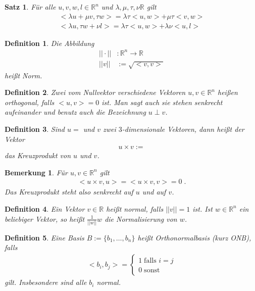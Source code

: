 \documentclass[]{article}
\newtheorem{Definition}{Definition}
\newtheorem{Satz}{Satz}
\newtheorem{Bemerkung}{Bemerkung}
\begin{document}
\begin{Satz}
Für alle $u,v,w,l \in \mathbb{R}^n$ und $\lambda, \mu, \tau, \nu \mathbb{R}$ gilt
\begin{align*}
<\lambda u + \mu v, \tau w> = \lambda \tau<u,w> + \mu \tau <v,w> \\
<\lambda u , \tau w + \nu l> = \lambda \tau<u,w> + \lambda \nu <u,l>
\end{align*}
\end{Satz}
\begin{Definition}
Die Abbildung 
\begin{align*}
|| \cdot || &: \mathbb{R}^n  \to \mathbb{R} \\
||v||  &:= \sqrt{<v,v>} 
\end{align*}  
heißt Norm.
\end{Definition}

\begin{Definition}
Zwei vom Nullvektor verschiedene Vektoren $u,v \in \mathbb{R}^n$ heißen orthogonal, falls $<u,v> = 0$ ist. 
Man sagt auch sie stehen senkrecht aufeinander und benutz auch die Bezeichnung $u \perp v$. 
\end{Definition}

\begin{Definition}
Sind $u = $ und $v$ zwei $3$-dimensionale Vektoren, dann heißt der Vektor
\begin{align*}
u \times v := 
\end{align*}
 das Kreuzprodukt von $u$ und $v$.
\end{Definition}

\begin{Bemerkung}
Für $u , v \in \mathbb{R}^n$ gilt
\begin{align*}
<u \times v, u> = <u \times v, v> = 0 \; . 
\end{align*}
Das Kreuzprodukt steht also senkrecht auf $u$ und auf $v$.
\end{Bemerkung}

\begin{Definition}
Ein Vektor $v \in \mathbb{R}$ heißt normal, falls $||v|| = 1$ ist.
Ist $w \in \mathbb{R}^n$ ein beliebiger Vektor, so heißt $\frac{1}{||w||} w$ die Normalisierung von $w$.
\end{Definition}

\begin{Definition}
Eine Basis  $B:= \{ b_1, \hdots , b_n \}$ heißt Orthonormalbasis (kurz ONB), falls 
\begin{align*}
<b_i, b_j> = \begin{cases}  1 \; \text{falls }  i = j  \\ 0 \; \text{sonst}\end{cases}
\end{align*}
gilt. Insbesondere sind alle $b_i$ normal.
\end{Definition}
\end{document}
